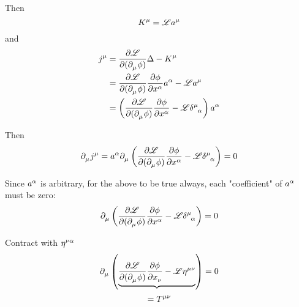 \documentclass{article}
\begin{document}
\noindent Then
\begin{equation*}
    \tensor{K}{^\mu} = \mathscr{L} \tensor{a}{^\mu}
\end{equation*}
and
\begin{align*}
    \tensor{j}{^\mu} &= \dfrac{ \partial \mathscr{L} }{ \partial ( \tensor{\partial}{_\mu} \phi ) } \Delta - \tensor{K}{^\mu} \\
    &= \dfrac{ \partial \mathscr{L} }{ \partial ( \tensor{\partial}{_\mu} \phi ) } \dfrac{ \partial \phi }{ \partial \tensor{x}{^\alpha} } \tensor{a}{^\alpha} - \mathscr{L} \tensor{a}{^\mu} \\
    &= \left( \dfrac{ \partial \mathscr{L} }{ \partial ( \tensor{\partial}{_\mu} \phi ) } \dfrac{ \partial \phi }{ \partial \tensor{x}{^\alpha} } - \mathscr{L} \tensor{\delta}{^\mu_\alpha} \right) \tensor{a}{^\alpha}
\end{align*}

\noindent Then
\begin{equation*}
    \tensor{\partial}{_\mu} \tensor{j}{^\mu} = \tensor{a}{^\alpha} \tensor{\partial}{_\mu} \left( \dfrac{ \partial \mathscr{L} }{ \partial ( \tensor{\partial}{_\mu} \phi ) } \dfrac{ \partial \phi }{ \partial \tensor{x}{^\alpha} } - \mathscr{L} \tensor{\delta}{^\mu_\alpha} \right) = 0
\end{equation*}

\noindent Since $\tensor{a}{^\alpha}$ is arbitrary, for the above to be true always, each "coefficient" of $\tensor{a}{^\alpha}$ must be zero:
\begin{equation*}
    \tensor{\partial}{_\mu} \left( \dfrac{ \partial \mathscr{L} }{ \partial ( \tensor{\partial}{_\mu} \phi ) } \dfrac{ \partial \phi }{ \partial \tensor{x}{^\alpha} } - \mathscr{L} \tensor{\delta}{^\mu_\alpha} \right) = 0
\end{equation*}

\noindent Contract with $\tensor{\eta}{^\nu^\alpha}$
\begin{equation*}
    \tensor{\partial}{_\mu} \left( \underbrace{ \dfrac{ \partial \mathscr{L} }{ \partial ( \tensor{\partial}{_\mu} \phi ) } \dfrac{ \partial \phi }{ \partial \tensor{x}{_\nu} } - \mathscr{L} \tensor{\eta}{^\mu^\nu} } \right) = 0
\end{equation*}
\begin{equation*}
    = \tensor{T}{^\mu^\nu}
\end{equation*}
\end{document}
